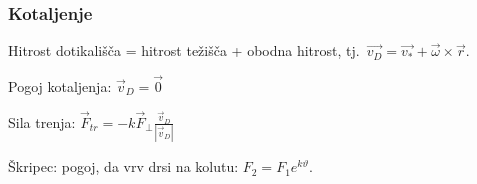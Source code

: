 \documentclass[a4paper,10pt]{article}
\theoremstyle{definition}
\let\theta\vartheta
\begin{document}
\subsubsection*{Kotaljenje}
Hitrost dotikališča = hitrost težišča + obodna hitrost, tj.\ $\vec{v_D} = \vec{v_*} + \vec{\omega} \times \vec{r}$.

Pogoj kotaljenja: $\vec{v}_D = \vec{0}$

Sila trenja: $\vec{F}_{tr} = - k \vec{F}_{\bot} \frac{\vec{v}_D}{|\vec{v}_D|}$

Škripec: pogoj, da vrv drsi na kolutu: $F_2 = F_1 e^{k \theta}$.
\end{document}
